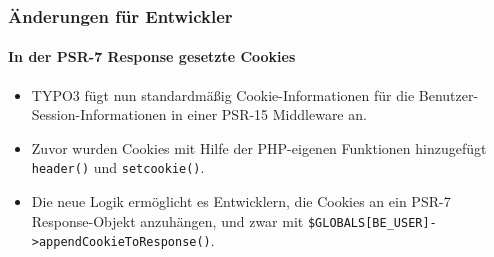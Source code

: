 %

\begin{frame}[fragile]
	\frametitle{Änderungen für Entwickler}
	\framesubtitle{In der PSR-7 Response gesetzte Cookies}

	\begin{itemize}
		\item TYPO3 fügt nun standardmäßig Cookie-Informationen für die Benutzer-Session-Informationen
			in einer PSR-15 Middleware an.
		\item Zuvor wurden Cookies mit Hilfe der PHP-eigenen Funktionen hinzugefügt\newline
			\smaller\texttt{header()} und \texttt{setcookie()}\normalsize.
		\item Die neue Logik ermöglicht es Entwicklern, die Cookies an ein PSR-7
			Response-Objekt anzuhängen, und zwar mit\newline
			\smaller\texttt{\$GLOBALS[BE\_USER]->appendCookieToResponse()}\normalsize.
	\end{itemize}
\end{frame}

